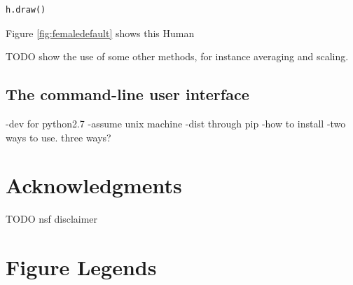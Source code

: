 \documentclass[10pt]{article}
\begin{document}
\begin{verbatim}
h.draw()
\end{verbatim}

Figure \ref{fig:femaledefault} shows this Human

TODO show the use of some other methods, for instance averaging and scaling.

\subsection*{The command-line user interface}


-dev for python2.7
-assume unix machine
-dist through pip
-how to install
-two ways to use. three ways?



\section*{Acknowledgments}
TODO nsf disclaimer


\section*{Figure Legends}
\end{document}
